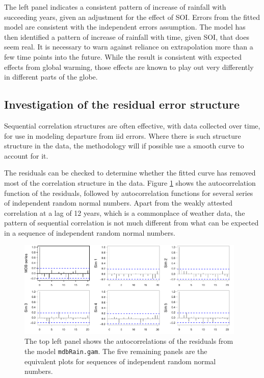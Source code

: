 \documentclass{tufte-book}\usepackage[]{graphicx}\usepackage[]{color}
\newcommand{\txtt}[1]{\texttt{#1}}
\begin{document}
The left panel indicates a consistent pattern of increase of rainfall
with succeeding years, given an adjustment for the effect of SOI.
Errors from the fitted model are consistent with the independent
errors assumption.  The model has then identified a pattern of
increase of rainfall with time, given SOI, that does seem real.  It is
necessary to warn against reliance on extrapolation more than a few
time points into the future. While the result is consistent with
expected effects from global warming, those effects are known to play
out very differently in different parts of the globe.

\subsection*{Investigation of the residual error structure}
Sequential correlation structures are often effective, with
data collected over time, for use in modeling departure from
iid errors.  Where there is such structure structure in the
data, the methodology will if possible use a smooth
curve to account for it.

The residuals can be checked to determine whether the fitted curve
has removed most of the correlation structure in the data.
Figure \ref{fig:ar1sims} shows the autocorrelation function of the
residuals, followed by autocorrelation functions for several series of
independent random normal numbers.  Apart from the weakly attested
correlation at a lag of 12 years, which is a commonplace of weather
data, the pattern of sequential correlation is not much different from
what can be expected in a sequence of independent random normal
numbers.

\begin{figure}
\begin{Schunk}


\centerline{\includegraphics[width=0.97\textwidth]{figs/9-ar1sims-1} }

\end{Schunk}
\caption{The top left panel shows the autocorrelations of the
  residuals from the model \txtt{mdbRain.gam}.  The five remaining
  panels are the equivalent plots for sequences of independent random
  normal numbers.}\label{fig:ar1sims}
\end{figure}
\end{document}
